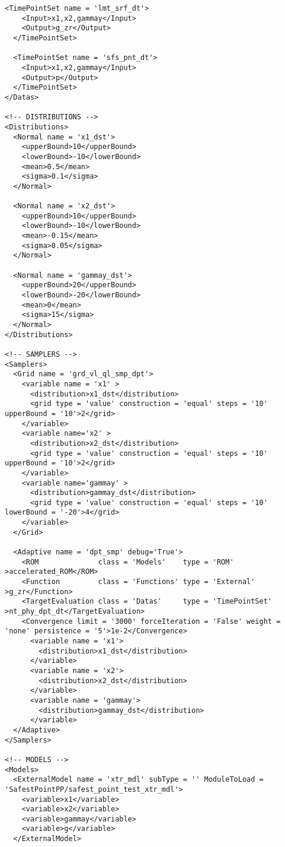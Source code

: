 \begin{lstlisting}[style=XML,morekeywords={debug,re,seeding,class,subType,limit}]
  <TimePointSet name = 'lmt_srf_dt'>
    <Input>x1,x2,gammay</Input>
    <Output>g_zr</Output>
  </TimePointSet>
  
  <TimePointSet name = 'sfs_pnt_dt'>
    <Input>x1,x2,gammay</Input>
    <Output>p</Output>
  </TimePointSet>
</Datas>

<!-- DISTRIBUTIONS -->
<Distributions>
  <Normal name = 'x1_dst'>
    <upperBound>10</upperBound>
    <lowerBound>-10</lowerBound>
  	<mean>0.5</mean>
    <sigma>0.1</sigma>
  </Normal>
  
  <Normal name = 'x2_dst'>
    <upperBound>10</upperBound>
    <lowerBound>-10</lowerBound>
    <mean>-0.15</mean>
    <sigma>0.05</sigma>
  </Normal>
  
  <Normal name = 'gammay_dst'>
    <upperBound>20</upperBound>
    <lowerBound>-20</lowerBound>
    <mean>0</mean>
    <sigma>15</sigma>
  </Normal>
</Distributions>

<!-- SAMPLERS -->
<Samplers>  
  <Grid name = 'grd_vl_ql_smp_dpt'>
    <variable name = 'x1' >
      <distribution>x1_dst</distribution>
      <grid type = 'value' construction = 'equal' steps = '10' upperBound = '10'>2</grid>
    </variable>  
    <variable name='x2' >
      <distribution>x2_dst</distribution>
      <grid type = 'value' construction = 'equal' steps = '10' upperBound = '10'>2</grid>
    </variable>
    <variable name='gammay' >
      <distribution>gammay_dst</distribution>
      <grid type = 'value' construction = 'equal' steps = '10' lowerBound = '-20'>4</grid>
    </variable>
  </Grid>
  
  <Adaptive name = 'dpt_smp' debug='True'>
    <ROM              class = 'Models'    type = 'ROM'           >accelerated_ROM</ROM>
    <Function         class = 'Functions' type = 'External'      >g_zr</Function>
    <TargetEvaluation class = 'Datas'     type = 'TimePointSet'  >nt_phy_dpt_dt</TargetEvaluation>
    <Convergence limit = '3000' forceIteration = 'False' weight = 'none' persistence = '5'>1e-2</Convergence>
      <variable name = 'x1'>
        <distribution>x1_dst</distribution>
      </variable>
      <variable name = 'x2'>
        <distribution>x2_dst</distribution>
      </variable>
      <variable name = 'gammay'>
        <distribution>gammay_dst</distribution>
      </variable>
  </Adaptive>
</Samplers>

<!-- MODELS -->
<Models>  
  <ExternalModel name = 'xtr_mdl' subType = '' ModuleToLoad = 'SafestPointPP/safest_point_test_xtr_mdl'>
    <variable>x1</variable>
    <variable>x2</variable>
    <variable>gammay</variable>
    <variable>g</variable>
  </ExternalModel>
  

\end{lstlisting}
